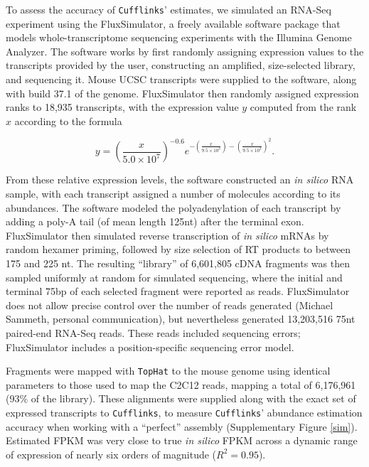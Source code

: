 \documentclass[12pt]{amsart}
\theoremstyle{definition}
\begin{document}
To assess the accuracy of {\tt Cufflinks}' estimates,
we simulated an RNA-Seq experiment using the FluxSimulator, a freely available
software package that models whole-transcriptome sequencing experiments with
the Illumina Genome Analyzer. \cite{Sammeth} The software works by first
randomly assigning expression values to the transcripts provided by the user,
constructing an amplified, size-selected library, and sequencing
it. Mouse UCSC transcripts were supplied to the software, along with build
37.1 of the genome. FluxSimulator then randomly assigned expression ranks to
18,935 transcripts, with the expression value $y$ computed from the rank $x$
according to the formula 

\begin{equation}
    y =\left( \frac{x}{5.0 \times 10^7}\right)^{-0.6}e^{-\left(\frac{x}{9.5\times{10^3}}\right) - \left(\frac{x}{9.5\times{10^3}}\right)^2}. 
\end{equation}

From these relative expression levels, the software constructed an \emph{in
silico} RNA sample, with each transcript assigned a number of molecules
according to its abundances. The software modeled the polyadenylation of each
transcript by adding a poly-A tail (of mean length 125nt) after the terminal
exon. FluxSimulator then simulated reverse transcription of \emph{in silico}
mRNAs by random hexamer priming, followed by size selection of RT products to
between 175 and 225 nt. The resulting ``library'' of 6,601,805 cDNA fragments
was then sampled uniformly at random for simulated sequencing, where the
initial and terminal 75bp of each selected fragment were reported as reads.
FluxSimulator does not allow precise control over the number of reads
generated (Michael Sammeth, personal communication), but nevertheless
generated 13,203,516 75nt paired-end RNA-Seq reads. These reads included
sequencing errors; FluxSimulator includes a position-specific sequencing
error model.

Fragments were mapped with {\tt TopHat} to the mouse genome using identical
parameters to those used to map the C2C12 reads, mapping a total of 6,176,961
(93\% of the library). These alignments were supplied along with the exact set
of expressed transcripts to {\tt Cufflinks}, to measure {\tt Cufflinks}' abundance
estimation accuracy when working with a ``perfect'' assembly (Supplementary
Figure \ref{sim}). Estimated FPKM was very close to true \emph{in silico} FPKM
across a dynamic range of expression of nearly six orders of magnitude
($R^2=0.95$).
\end{document}
